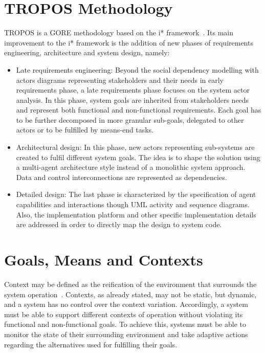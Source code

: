 \section{TROPOS Methodology}

TROPOS is a GORE methodology based on the i* framework~\cite{Bresciani:2004}. Its main improvement to the i* framework is the addition of new phases of requirements engineering, architecture and system design, namely:

\begin{itemize}

\item Late requirements engineering: Beyond the social dependency modelling with actors diagrams representing stakeholders and their needs in early requirements phase, a late requirements phase focuses on the system actor analysis. In this phase, system goals are inherited from stakeholders needs and represent both functional and non-functional requirements. Each goal has to be further decomposed in more granular sub-goals, delegated to other actors or to be fulfilled by means-end tasks. 
\medskip

\item Architectural design: In this phase, new actors representing sub-systems are created to fulfil different system goals. The idea is to shape the solution using a multi-agent architecture style instead of a monolithic system approach. Data and control interconnections are represented as dependencies.
\medskip

\item Detailed design: The last phase is characterized by the specification of agent capabilities and interactions though UML activity and sequence diagrams. Also, the implementation platform and other specific implementation details are addressed in order to directly map the design to system code.

\end{itemize}


\section{Goals, Means and Contexts}

Context may be defined as the reification of the environment that surrounds the system operation~\cite{Andrea01aframework}. Contexts, as already stated, may not be static, but dynamic, and a system has no control over the context variation. Accordingly, a system must be able to support different contexts of operation without violating its functional and non-functional goals. To achieve this, systems must be able to monitor the state of their surrounding environment and take adaptive actions regarding the alternatives used for fulfilling their goals.

